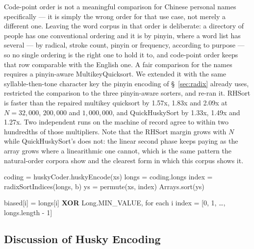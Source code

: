 \documentclass[twoside,leqno,twocolumn]{article}
\begin{document}
Code-point order is not a meaningful comparison for Chinese personal names specifically —
it is simply the wrong order for that use case, not merely a different one.
Leaving the word corpus in that order is deliberate: a directory of people has one conventional
ordering and it is by pinyin, where a word list has several --- by radical, stroke count, pinyin or
frequency, according to purpose --- so no single ordering is the right one to hold it to,
and code-point order keeps that row comparable with the English one.
A fair comparison for the names requires a pinyin-aware MultikeyQuicksort.
We extended it with the same syllable-then-tone character key the pinyin encoding of \S~\ref{sec:radix} already uses,
restricted the comparison to the three pinyin-aware sorters, and re-ran it.
RHSort is faster than the repaired multikey quicksort by 1.57x, 1.83x and 2.09x at $N = 32{,}000$,
$200{,}000$ and $1{,}000{,}000$, and QuickHuskySort by 1.33x, 1.49x and 1.27x.
Two independent runs on the machine of record agree to within two hundredths of those multipliers.
Note that the RHSort margin grows with $N$ while QuickHuskySort's does not:
the linear second phase keeps paying as the array grows where a linearithmic one cannot,
which is the same pattern the natural-order corpora show and the clearest form in which this corpus
shows it.

\begin{algorithm2e}
 coding = huskyCoder.huskyEncode(xs)\;
 longs = coding.longs\;
 index = radixSortIndices(longs, b)\;
 ys = permute(xs, index)\;
 Arrays.sort(ys)\;
 \caption{RadixHuskySort.sort}
 \label{alg:the_alg5}
\end{algorithm2e}

\begin{algorithm2e}
 biased[i] = longs[i] {\bf XOR} Long.MIN\_VALUE, for each i\;
 index = [0, 1, \ldots, longs.length - 1]\;
 \caption{radixSortIndices (LSD, deferred permutation)}
 \label{alg:the_alg6}
\end{algorithm2e}

\subsection{Discussion of Husky Encoding}
\end{document}
